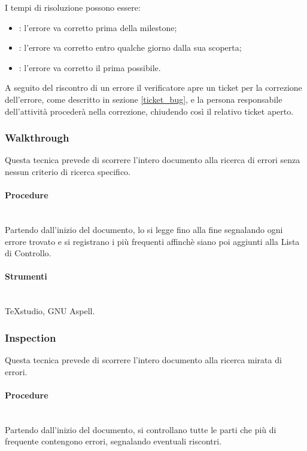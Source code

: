 I tempi di risoluzione possono essere:
\begin{itemize}
\item {}: l'errore va corretto prima della milestone;
\item {}: l'errore va corretto entro qualche giorno dalla sua scoperta;
\item {}: l'errore va corretto il prima possibile.
\end{itemize}

A seguito del riscontro di un errore il verificatore apre un ticket per la correzione dell'errore, come descritto in sezione \ref{ticket_bug}, e la persona responsabile dell'attivit\`{a} procederà nella correzione, chiudendo così il relativo ticket aperto.




\subsubsection{Walkthrough}
Questa tecnica prevede di scorrere l'intero documento alla ricerca di errori senza nessun criterio di ricerca specifico.
\paragraph{Procedure} \hfill \\

Partendo dall'inizio del documento, lo si legge fino alla fine segnalando ogni errore trovato e si registrano i più frequenti affinchè siano poi aggiunti alla Lista di Controllo.
\paragraph{Strumenti} \hfill \\

TeXstudio, GNU Aspell.

\subsubsection{Inspection}
Questa tecnica prevede di scorrere l'intero documento alla ricerca mirata di errori.
\paragraph{Procedure} \hfill \\

Partendo dall'inizio del documento, si controllano tutte le parti che più di frequente contengono errori, segnalando eventuali riscontri.
